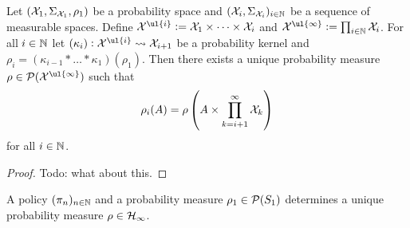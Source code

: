 \documentclass{article}
\begin{document}
\begin{thm}
  Let $(\mathcal{X}_1, \Sigma_{\mathcal{X}_1}, \rho_1)$ be a probability space and
  $(\mathcal{X}_i, \Sigma_{\mathcal{X}_i})_{i \in \mathbb{N}}$ be a sequence of
  measurable spaces. Define $\Cal{X}^{\ul{i}} \defeq 
  \Cal{X}_1 \times \dots \times \Cal{X}_i$ and
  $\Cal{X}^{\ul{\infty}} \defeq \prod_{i \in \N} \Cal{X}_i$.
  For all $i \in \mathbb{N}$ let
  $(\kappa_i) : \Cal{X}^{\ul{i}} \leadsto \Cal{X}_{i+1}$
  be a probability kernel and
  $\rho_i = (\kappa_{i-1} * \dots * \kappa_1)(\rho_1)$.
  Then there exists a unique probability measure
  $\rho \in \Cal{P}(\Cal{X}^{\ul{\infty}})$ such that
  \[ \rho_i(A) = \rho \left( A \times \prod_{k=i+1}^\infty \mathcal{X}_k \right) \]
  for all $i \in \mathbb{N}$.
\end{thm}
\begin{proof}
  Todo: what about this.
\end{proof}

\begin{cor}
  A policy $(\pi_n)_{n \in \mathbb{N}}$ and a probability measure
  $\rho_1 \in \mathcal{P}(S_1)$ determines a unique probability measure
  $\rho \in \mathcal{H}_\infty$.
\end{cor}
\end{document}
